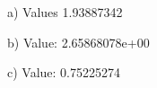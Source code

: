 \documentclass{article}
\begin{document}
\section{}
a) Values 1.93887342
\begin{figure}[H]
\end{figure}
b) Value: 2.65868078e+00
\begin{figure}[H]
\end{figure}
c) Value: 0.75225274
\end{document}

